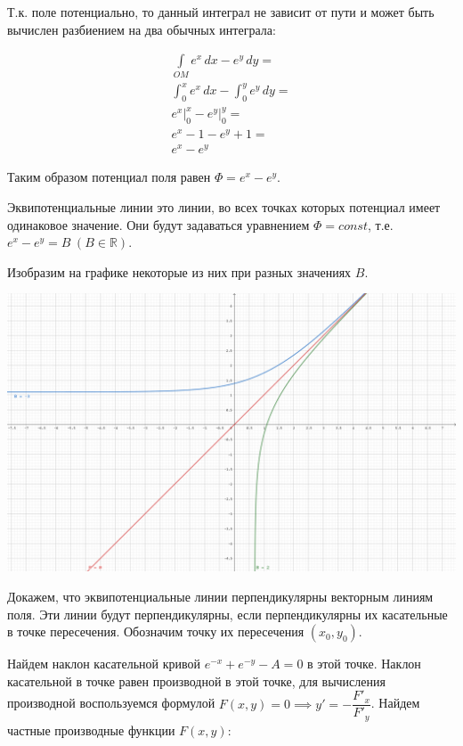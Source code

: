 Т.к. поле потенциально, то данный интеграл не зависит от пути и может быть
вычислен разбиением на два обычных интеграла:

\begin{equation*}\begin{split}
    \int\limits_{OM} e^x \,dx - e^y \,dy = \\
    \int_0^x e^x\,dx - \int_0^y e^y\,dy = \\
    e^x \bigg\vert_0^x - e^y \bigg\vert_0^y = \\
    e^x - 1 - e^y + 1 = \\
    e^x - e^y
  \end{split}\end{equation*}

Таким образом потенциал поля равен \(\Phi = e^x - e^y\).

\bigskip

Эквипотенциальные линии это линии, во всех точках которых потенциал имеет
одинаковое значение. Они будут задаваться уравнением \(\Phi = const\), т.е.
\(e^x - e^y = B \hspace{3pt} (B \in \mathbb{R})\).

Изобразим на графике некоторые из них при разных значениях \(B\).

\includegraphics[width=\textwidth]{images/t02_p02.png}

\bigskip

Докажем, что эквипотенциальные линии перпендикулярны векторным линиям поля. Эти
линии будут перпендикулярны, если перпендикулярны их касательные в точке
пересечения. Обозначим точку их пересечения \((x_0, y_0)\).

Найдем наклон касательной кривой \(e^{-x} + e^{-y} - A = 0\) в этой точке.
Наклон касательной в точке равен производной в этой точке, для вычисления
производной воспользуемся формулой
\(F(x, y) = 0 \implies y' = -\dfrac{F'_x}{F'_y}\). Найдем частные производные
функции \(F(x, y)\):

